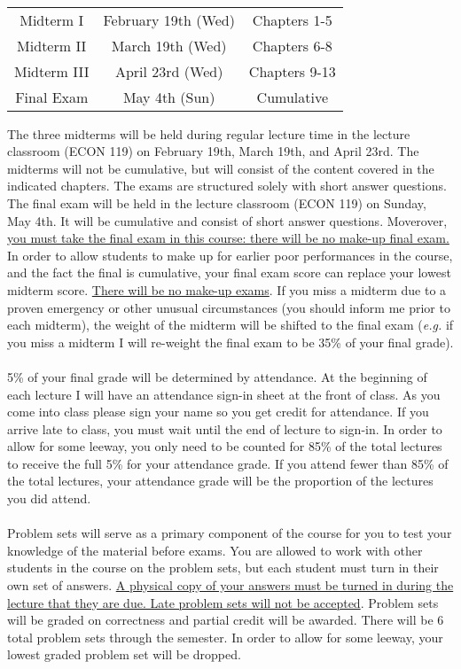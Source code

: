\documentclass[11pt]{article}
\begin{document}
\\\begin{center}
\begin{tabular}{ccc}
    Midterm I & February 19th (Wed) & Chapters 1-5 \\
    Midterm II & March 19th (Wed) & Chapters 6-8 \\
   	Midterm III & April 23rd (Wed) & Chapters 9-13 \\
    Final Exam & May 4th (Sun) & Cumulative \\
\end{tabular}
\end{center}
The three midterms will be held during regular lecture time in the lecture classroom (ECON 119) on February 19th, March 19th, and April 23rd.  The midterms will not be cumulative, but will consist of the content covered in the indicated chapters.  The exams are structured solely with short answer questions.  The final exam will be held in the lecture classroom (ECON 119) on Sunday, May 4th.  It will be cumulative and consist of short answer questions.  Moverover, \uline{you must take the final exam in this course: there will be no make-up final exam.}  In order to allow students to make up for earlier poor performances in the course, and the fact the final is cumulative, your final exam score can replace your lowest midterm score.  \uline{There will be no make-up exams}.  If you miss a midterm due to a proven emergency or other unusual circumstances (you should inform me prior to each midterm), the weight of the midterm will be shifted to the final exam (\emph{e.g.} if you miss a midterm I will re-weight the final exam to be 35\% of your final grade).   \\

\newpage
{}\\
5\% of your final grade will be determined by attendance.  At the beginning of each lecture I will have an attendance sign-in sheet at the front of class.  As you come into class please sign your name so you get credit for attendance.  If you arrive late to class, you must wait until the end of lecture to sign-in.  In order to allow for some leeway, you only need to be counted for 85\% of the total lectures to receive the full 5\% for your attendance grade.  If you attend fewer than 85\% of the total lectures, your attendance grade will be the proportion of the lectures you did attend.\\

\\
Problem sets will serve as a primary component of the course for you to test your knowledge of the material before exams.  You are allowed to work with other students in the course on the problem sets, but each student must turn in their own set of answers.  \uline{A physical copy of your answers must be turned in during the lecture that they are due.  Late problem sets will not be accepted}.  Problem sets will be graded on correctness and partial credit will be awarded. There will be 6 total problem sets through the semester.  In order to allow for some leeway, your lowest graded problem set will be dropped.\\ 
\end{document}
